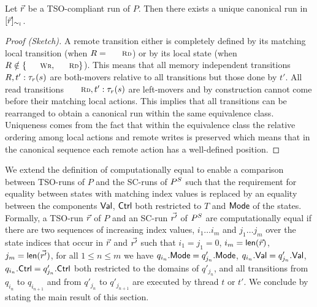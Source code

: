 \begin{lemma}\label{lem:canonical}
Let $\vec{r}$ be a TSO-compliant run of $P$.
Then there exists a unique canonical run in $[\vec{r}]_{\sim_l}$.
\end{lemma}
\begin{proof}[Proof (Sketch)]
A remote transition either is completely defined by its matching local transition (when $R=\textnormal{\sc\small Rd}$) or by its local state (when $R\notin\{\textnormal{\sc\small Wr},\textnormal{\sc\small Rd}\}$).
This means that all memory independent transitions $R,t':\tau_{r}(s)$ are both-movers relative to all transitions but those done by $t'$.
All read transitions $\textnormal{\sc\small Rd},t':\aliremtransx s$ are left-movers and by construction cannot come before their matching local actions.
This implies that all transitions can be rearranged to obtain a canonical run within the same equivalence class.
Uniqueness comes from the fact that within the equivalence class the relative ordering among local actions and remote writes is preserved which means that in the canonical sequence each remote action has a well-defined position.
\end{proof}


We extend the definition of computationally equal to enable a comparison between TSO-runs of $P$ and the SC-runs of $P^S$ such that the requirement for equality between states with matching index values is replaced by an equality between the components $\mathsf{Val}$, $\mathsf{Ctrl}$ both restricted to $T$ and $\mathsf{Mode}$ of the states.
Formally, a TSO-run $\vec{r}$ of $P$ and an SC-run $\vec{r'}$ of $P^S$ are computationally equal if there are two sequences of increasing index values, $i_1\ldots i_m$ and $j_1\ldots j_m$ over the state indices that occur in $\vec{r}$ and $\vec{r'}$ such that $i_1=j_1=0$, $i_m=\mathsf{len}(\vec{r})$, $j_m=\mathsf{len}(\vec{r'})$, for all $1\leq n\leq m$ we have $q_{i_n}.\mathsf{Mode}=q'_{j_n}.\mathsf{Mode}$, $q_{i_n}.\mathsf{Val}=q'_{j_n}.\mathsf{Val}$, $q_{i_n}.\mathsf{Ctrl}=q'_{j_n}.\mathsf{Ctrl}$ both restricted to the domains of $q'_{j_n}$, and all transitions from $q_{i_n}$ to $q_{i_{n+1}}$ and from $q'_{j_n}$ to $q'_{j_{n+1}}$ are executed by thread $t$ or $t'$.
We conclude by stating the main result of this section.

